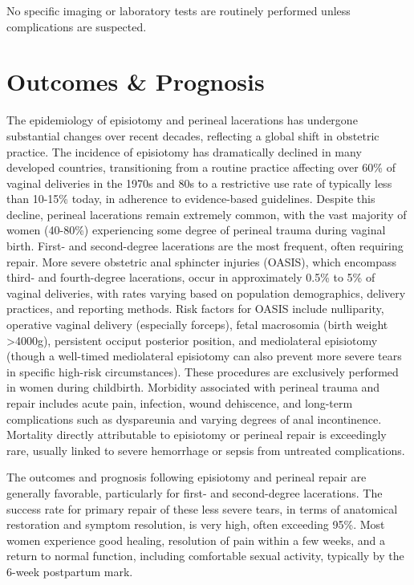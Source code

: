 No specific imaging or laboratory tests are routinely performed unless complications are suspected.

\section*{Outcomes \& Prognosis}
The epidemiology of episiotomy and perineal lacerations has undergone substantial changes over recent decades, reflecting a global shift in obstetric practice. The incidence of episiotomy has dramatically declined in many developed countries, transitioning from a routine practice affecting over 60\% of vaginal deliveries in the 1970s and 80s to a restrictive use rate of typically less than 10-15\% today, in adherence to evidence-based guidelines. Despite this decline, perineal lacerations remain extremely common, with the vast majority of women (40-80\%) experiencing some degree of perineal trauma during vaginal birth. First- and second-degree lacerations are the most frequent, often requiring repair. More severe obstetric anal sphincter injuries (OASIS), which encompass third- and fourth-degree lacerations, occur in approximately 0.5\% to 5\% of vaginal deliveries, with rates varying based on population demographics, delivery practices, and reporting methods. Risk factors for OASIS include nulliparity, operative vaginal delivery (especially forceps), fetal macrosomia (birth weight >4000g), persistent occiput posterior position, and mediolateral episiotomy (though a well-timed mediolateral episiotomy can also prevent more severe tears in specific high-risk circumstances). These procedures are exclusively performed in women during childbirth. Morbidity associated with perineal trauma and repair includes acute pain, infection, wound dehiscence, and long-term complications such as dyspareunia and varying degrees of anal incontinence. Mortality directly attributable to episiotomy or perineal repair is exceedingly rare, usually linked to severe hemorrhage or sepsis from untreated complications.

The outcomes and prognosis following episiotomy and perineal repair are generally favorable, particularly for first- and second-degree lacerations. The success rate for primary repair of these less severe tears, in terms of anatomical restoration and symptom resolution, is very high, often exceeding 95\%. Most women experience good healing, resolution of pain within a few weeks, and a return to normal function, including comfortable sexual activity, typically by the 6-week postpartum mark.

